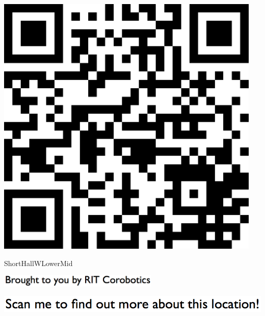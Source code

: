 \documentclass[letterpaper]{article}
\begin{document}
 \begingroup 
 \centerline{\includegraphics[scale=1,width=5in,height=5in]{ShortHallWLowerMid.png}} 
 \endgroup 
 \vspace*{\fill} 

 \hfill{\small ShortHallWLowerMid} 

  \vspace{0.7in} 
 
 \centerline{\includegraphics[scale=1,width=3in]{text-bottom.png}} 
 
 \pagebreak 
{} 
 \vspace*{\fill} 
 
  \centerline{\includegraphics[scale=1,width=6in]{text-top.png}} 
 
 \vspace{0.5in} 
 
\end{document}
